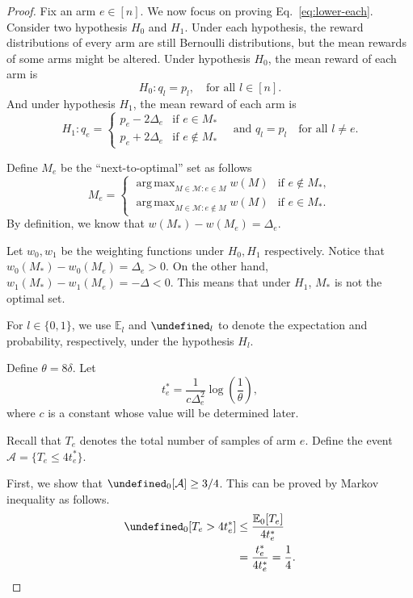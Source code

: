\documentclass{article}
\newcommand{\E}{\mathbb E}
\newcommand{\M}{\mathcal M}
\DeclareMathOperator{\argmax}{arg\,max}
\let\Pr\undefined
\DeclareMathOperator{\Pr}{Pr}
\begin{document}
\begin{spacing}{1.1}
\begin{proof}
Fix an arm $e\in [n]$. We now focus on proving Eq.~\eqref{eq:lower-each}.
Consider two hypothesis $H_0$ and $H_1$. 
Under each hypothesis, the reward distributions of every arm are still Bernoulli distributions, but the mean rewards of some arms might be altered.
Under hypothesis $H_0$, the mean reward of each arm is 
$$
H_0: q_l = p_l, \quad \text{for all } l \in [n].
$$
And under hypothesis $H_1$, the mean reward of each arm is 
$$
H_1: q_e = \begin{cases}
	p_e-2\Delta_e & \text{if } e\in M_*\\
	p_e+2\Delta_e & \text{if } e\not\in M_*
\end{cases} \quad\text{and } q_l = p_l\quad\text{for all } l\not = e.
$$

Define $M_e$ be the ``next-to-optimal'' set as follows 
$$
M_e = \begin{cases}
		 \argmax_{M\in \M: e \in M} w(M) & \text{if } e\not \in M_*, \\
	     \argmax_{M\in \M: e \not\in M} w(M) & \text{if } e\in M_*.
	  \end{cases}
$$
By definition, we know that $w(M_*)-w(M_e)=\Delta_e$.

Let $w_0, w_1$ be the weighting functions under $H_0,H_1$ respectively.
Notice that $w_0(M_*)-w_0(M_e)=\Delta_e > 0$.
On the other hand, 
$w_1(M_*)-w_1(M_e) = -\Delta < 0$.
This means that under $H_1$, $M_*$ is not the optimal set.

For $l\in \{0,1\}$, we use $\E_l$ and $\Pr_l$ to denote the expectation and probability, respectively, under the hypothesis $H_l$.

Define $\theta=8\delta$. Let
$$
t_e^* = \frac{1}{c\Delta^2_e}\log\left(\frac{1}{\theta}\right),
$$
where $c$ is a constant whose value will be determined later.

Recall that $T_e$ denotes the total number of samples of arm $e$.
Define the event
$\mathcal A = \{T_e \le 4t_e^* \}$.

First, we show that $\Pr_0[\mathcal A] \ge 3/4$. 
This can be proved by Markov inequality as follows.
\begin{align*}
\Pr_0[T_e > 4t_e^*] &\le \frac{\E_0[T_e]}{4t_e^*} \\
					  &= \frac{t_e^*}{4t_e^*} = \frac14.
\end{align*}


\end{proof}
\end{spacing}
\end{document}
